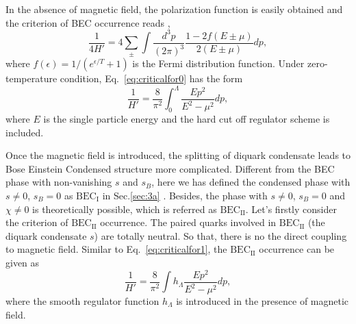 \documentclass[prd, showpacs,nofootinbib,amsmath,amssymb,12pt]{revtex4}
\begin{document}
In the absence of magnetic field, the 
polarization function is easily obtained and the criterion of BEC occurrence reads
\cite{abuki2010nambu},
\begin{equation}\label{eq:criticalfor0}
  \frac{1}{4H'} =  4\sum_{\pm}\int \frac{d^3p}{(2\pi)^3} \frac{1-2f(E\pm \mu)}{2(E \pm \mu)}dp ,
\end{equation}
where $f(\epsilon) =1/(e^{\epsilon/T} +1)$ is the Fermi distribution function.
Under zero-temperature condition,  Eq.~\eqref{eq:criticalfor0} has  the form
\begin{equation}
\label{eq:criticalfor1}
\frac{1}{H'} = \frac{8}{ \pi^2} \int_0^\Lambda\frac{ E p^2}{E^2 - \mu^2} dp,
\end{equation}
where $E$ is the single particle energy and the  hard cut off regulator scheme is included. 

Once the magnetic field is introduced,   the splitting of diquark condensate leads to  Bose Einstein Condensed structure more complicated.
Different from the BEC phase with non-vanishing $s$ and $s_B$, here we has defined the condensed phase with  $s\neq 0$, $s_B=0$ as
 $\text{BEC}_\text{I}$ in Sec.\ref{sec:3a} . Besides,  the phase with $s\neq 0$, $s_B=0$ and $\chi  \neq 0$
 is theoretically possible,  which is referred as  $\text{BEC}_\text{II}$.
Let's firstly consider  the criterion of  $\text{BEC}_\text{II}$  occurrence.
The paired quarks involved in   $\text{BEC}_\text{II}$ (the diquark condensate  $s$)  are totally neutral.
So that, there is no the direct coupling to magnetic field. Similar to Eq.~\eqref{eq:criticalfor1}, 
the $\text{BEC}_\text{II}$ occurrence can be given as
\begin{equation}
\label{eq:criticalforn}
\frac{1}{H'} =\frac{8}{ \pi^2} \int h_\Lambda  \frac{ E p^2}{E^2 - \mu^2} dp,
\end{equation}
where the smooth regulator function $h_\Lambda$ is introduced in the presence of magnetic field.
\end{document}
